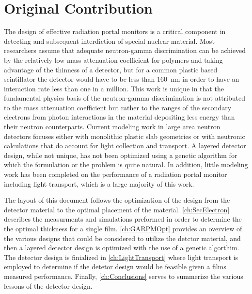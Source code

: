 \section{Original Contribution}
\label{sec:OrginalContribution}
The design of effective radiation portal monitors is a critical component in detecting and subsequent interdiction of special nuclear material.
Most researchers assume that adequate neutron-gamma discrimination can be achieved by the relatively low mass attenuation coefficient for polymers and taking advantage of the thinness of a detector, but for a common plastic based scintillator the detector would have to be less than \SI{160}{\nm} in order to have an interaction rate less than one in a million.
This work is unique in that the fundamental physics basis of the neutron-gamma discrimination is not attributed to the mass attenuation coefficient but rather to the ranges of the secondary electrons from photon interactions in the material depositing less energy than their neutron counterparts.
Current modeling work in large area neutron detectors focuses either with monolithic plastic slab geometries or with neutronic calculations that do account for light collection and transport.
A layered detector design, while not unique, has not been optimized using a genetic algorithm for which the formulation or the problem is quite natural.
In addition, little modeling work has been completed on the performance of a radiation portal monitor including light transport, which is a large majority of this work.


The layout of this document follows the optimization of the design from the detector material to the optimal placement of the material.
\autoref{ch:SecElectron} describes the measurments and simulations preformed in order to determine the the optimal thickness for a single film.
\autoref{ch:GARPMOpt} provides an overview of the various designs that could be considered to utilize the detctor material, and then a layered detector design is optimized with the use of a genetic algorthim.
The detector design is finialized in \autoref{ch:LightTransport} where light transport is employed to determine if the detetor design would be feasible given a films measured performance.
Finally, \autoref{ch:Conclusions} serves to summerize the various lessons of the detector design.
